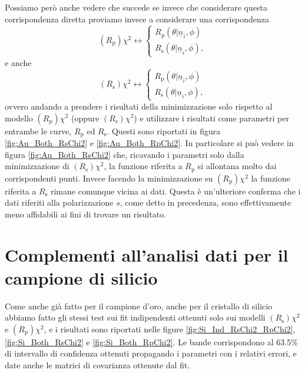 \documentclass[
    prb,altaffilletter,citeautoscript,
    amsmath,amssymb,
    showpacs,showkeys,floatfix,
    reprint
]{revtex4-1}
\begin{document}
Possiamo però anche vedere che succede se invece che considerare questa corrispondenza diretta proviamo invece a considerare una corrispondenza \begin{equation}
    (R_\mathrm{p})\chi^2 \longleftrightarrow 
    \begin{cases}
        R_\mathrm{p}(\theta|{\underline n_i}, \phi)\\
        R_\mathrm{s}(\theta|{\underline n_i}, \phi),
    \end{cases}
\end{equation} e anche \begin{equation}
    (R_\mathrm{s})\chi^2 \longleftrightarrow 
    \begin{cases}
        R_\mathrm{p}(\theta|{\underline n_i}, \phi)\\
        R_\mathrm{s}(\theta|{\underline n_i}, \phi),
    \end{cases}
\end{equation} ovvero andando a prendere i risultati della minimizzazione solo rispetto al modello $(R_\mathrm{p})\chi^2$ (oppure $(R_\mathrm{s})\chi^2$) e utilizzare i risultati come parametri per entrambe le curve, $R_\mathrm{p}$ ed $R_\mathrm{s}$. Questi sono riportati in figura \ref{fig:Au_Both_RsChi2} e \ref{fig:Au_Both_RpChi2}. In particolare si può vedere in figura \ref{fig:Au_Both_RsChi2} che, ricavando i parametri solo dalla minimizzazione di $(R_\mathrm{s})\chi^2$, la funzione riferita a $R_\mathrm{p}$ si allontana molto dai corrispondenti punti. Invece facendo la minimizzazione su $(R_\mathrm{p})\chi^2$ la funzione riferita a $R_\mathrm{s}$ rimane comunque vicina ai dati. Questa è un'ulteriore conferma che i dati riferiti alla polarizzazione $s$, come detto in precedenza, sono effettivamente meno affidabili ai fini di trovare un risultato.

\section{Complementi all'analisi dati per il campione di silicio}

Come anche già fatto per il campione d'oro, anche per il cristallo di silicio abbiamo fatto gli stessi test sui fit indipendenti ottenuti solo sui modelli $(R_\mathrm{s})\chi^2$ e $(R_\mathrm{p})\chi^2$, e i risultati sono riportati nelle figure \ref{fig:Si_Ind_RsChi2_RpChi2}, \ref{fig:Si_Both_RsChi2} e \ref{fig:Si_Both_RpChi2}. Le bande corrispondono al 63.5\% di intervallo di confidenza ottenuti propagando i parametri con i relativi errori, e date anche le matrici di covarianza ottenute dal fit.
\end{document}
